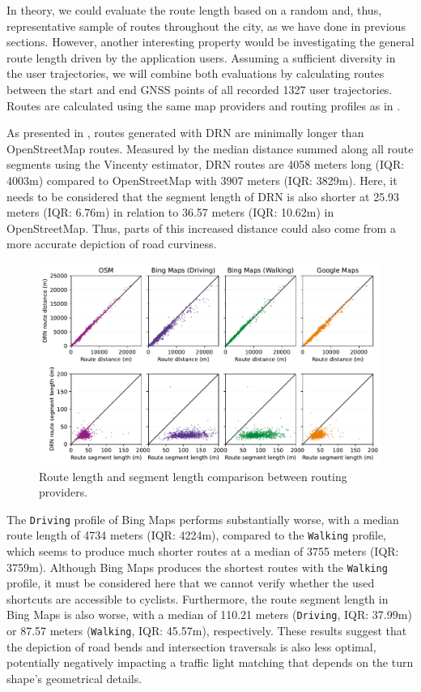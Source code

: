 In theory, we could evaluate the route length based on a random and, thus, representative sample of routes throughout the city, as we have done in previous sections. However, another interesting property would be investigating the general route length driven by the application users. Assuming a sufficient diversity in the user trajectories, we will combine both evaluations by calculating routes between the start and end GNSS points of all recorded 1327 user trajectories. Routes are calculated using the same map providers and routing profiles as in .

As presented in , routes generated with DRN are minimally longer than OpenStreetMap routes. Measured by the median distance summed along all route segments using the Vincenty estimator, DRN routes are 4058 meters long (IQR: 4003m) compared to OpenStreetMap with 3907 meters (IQR: 3829m). Here, it needs to be considered that the segment length of DRN is also shorter at 25.93 meters (IQR: 6.76m) in relation to 36.57 meters (IQR: 10.62m) in OpenStreetMap. Thus, parts of this increased distance could also come from a more accurate depiction of road curviness. 

\begin{figure}[t]
\centering 
\includegraphics[width=\linewidth]{images/routing-distance-comparison.pdf}
\caption{Route length and segment length comparison between routing providers.}
\label{fig:routing-distance-comparison}
\end{figure}

The \texttt{Driving} profile of Bing Maps performs substantially worse, with a median route length of 4734 meters (IQR: 4224m), compared to the \texttt{Walking} profile, which seems to produce much shorter routes at a median of 3755 meters (IQR: 3759m). Although Bing Maps produces the shortest routes with the \texttt{Walking} profile, it must be considered here that we cannot verify whether the used shortcuts are accessible to cyclists. Furthermore, the route segment length in Bing Maps is also worse, with a median of 110.21 meters (\texttt{Driving}, IQR: 37.99m) or 87.57 meters (\texttt{Walking}, IQR: 45.57m), respectively. These results suggest that the depiction of road bends and intersection traversals is also less optimal, potentially negatively impacting a traffic light matching that depends on the turn shape's geometrical details. 

